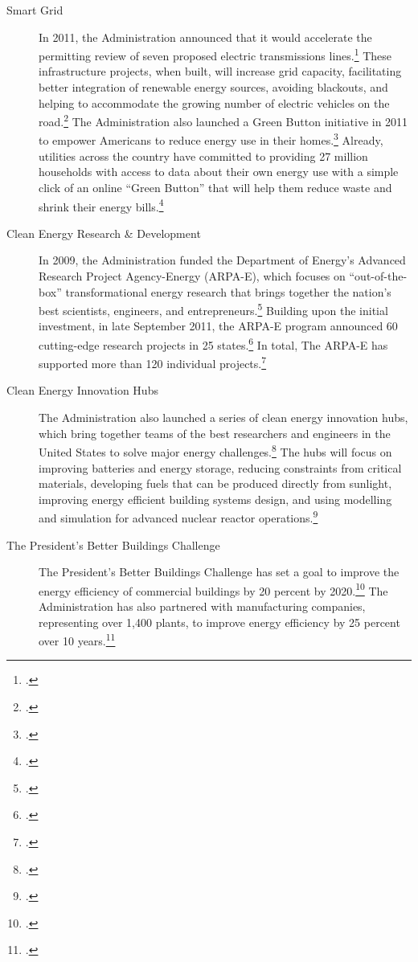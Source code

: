 \begin{description}
	\item [Smart Grid] In 2011, the Administration announced that it would accelerate the permitting review of seven proposed electric transmissions lines.\footcite[][]{GridModernization} These infrastructure projects, when built, will increase grid capacity, facilitating better integration of renewable energy sources, avoiding blackouts, and helping to accommodate the growing number of electric vehicles on the road.\footcite[][]{GridModernization} The Administration also launched a Green Button initiative in 2011 to empower Americans to reduce energy use in their homes.\footcite[][]{GreenButton} Already, utilities across the country have committed to providing 27 million households with access to data about their own energy use with a simple click of an online ``Green Button'' that will help them reduce waste and shrink their energy bills.\footcite[][]{GreenButton}
	\item [Clean Energy Research \& Development] In 2009, the Administration funded the Department of Energy’s Advanced Research Project Agency-Energy (ARPA-E), which focuses on ``out-of-the-box'' transformational energy research that brings together the nation’s best scientists, engineers, and entrepreneurs.\footcite[][]{ARPAE} Building upon the initial investment, in late September 2011, the ARPA-E program announced 60 cutting-edge research projects in 25 states.\footcite[][]{ARPAEProjects} In total, The ARPA-E has supported more than 120 individual projects.\footcite[][]{ARPAEProjects}
	\item [Clean Energy Innovation Hubs] The Administration also launched a series of clean energy innovation hubs, which bring together teams of the best researchers and engineers in the United States to solve major energy challenges.\footcite[][]{EnergyHubs} The hubs will focus on improving batteries and energy storage, reducing constraints from critical materials, developing fuels that can be produced directly from sunlight, improving energy efficient building systems design, and using modelling and simulation for advanced nuclear reactor operations.\footcite[][]{Hubs}
	\item [The President's Better Buildings Challenge] The President's Better Buildings Challenge has set a goal to improve the energy efficiency of commercial buildings by 20 percent by 2020.\footcite[][]{BetterBuildings} The Administration has also partnered with manufacturing companies, representing over 1,400 plants, to improve energy efficiency by 25 percent over 10 years.\footcite[][]{BetterBuildings}
\end{description}	



